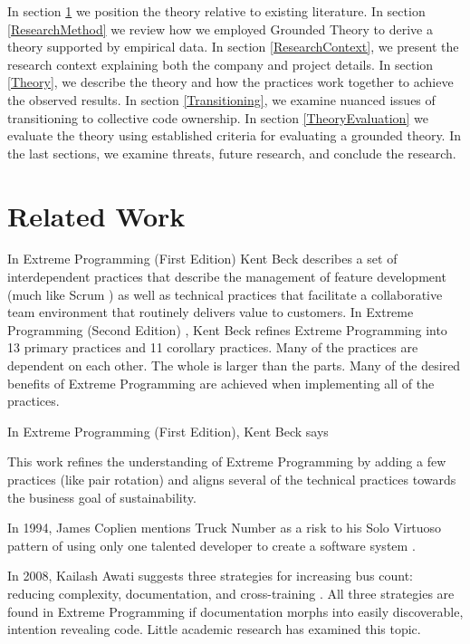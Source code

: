 In section \ref{RelatedWork} we position the theory relative to existing literature. In section \ref{ResearchMethod} we review how we employed Grounded Theory to derive a theory supported by empirical data. In section \ref{ResearchContext}, we present the research context explaining both the company and project details. In section \ref{Theory}, we describe the theory and how the practices work together to achieve the observed results. In section \ref{Transitioning}, we examine nuanced issues of transitioning to collective code ownership. In section \ref{TheoryEvaluation} we evaluate the theory using established criteria for evaluating a grounded theory. In the last sections, we examine threats, future research, and conclude the research.
\section{Related Work}
\label{RelatedWork}

In Extreme Programming (First Edition) \cite{ExtremeProgramming2000} Kent Beck describes a set of interdependent practices that describe the management of feature development (much like Scrum \cite{Scrum}) as well as technical practices that facilitate a collaborative team environment that routinely delivers value to customers. In Extreme Programming (Second Edition) \cite{ExtremeProgramming2004}, Kent Beck refines Extreme Programming into 13 primary practices and 11 corollary practices. Many of the practices are dependent on each other. The whole is larger than the parts. Many of  the desired benefits of Extreme Programming are achieved when implementing all of the practices. 

In Extreme Programming (First Edition), Kent Beck says    \cite{ExtremeProgramming2000}

This work refines the understanding of Extreme Programming by adding a few practices (like pair rotation) and aligns several of the technical practices towards the business goal of sustainability.

In 1994, James Coplien mentions Truck Number as a risk to his Solo Virtuoso pattern of using only one talented developer to create a software system \cite{Coplien1994}.

In 2008, Kailash Awati suggests three strategies for increasing bus count: reducing complexity, documentation, and cross-training \cite{AwatiBusFactor}. All three strategies are found in Extreme Programming if documentation morphs into easily discoverable, intention revealing code. Little academic research has examined this topic. 


